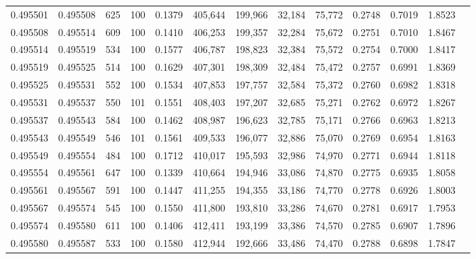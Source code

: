\begin{tabular}{rrrrrrrrrrrrr}
0.495501 & 0.495508 &   625 & 100 &                                     0.1379 & 405,644 & 199,966 &  32,184 &  75,772 & 0.2748 & 0.7019 & 1.8523 \\
0.495508 & 0.495514 &   609 & 100 &                                     0.1410 & 406,253 & 199,357 &  32,284 &  75,672 & 0.2751 & 0.7010 & 1.8467 \\
0.495514 & 0.495519 &   534 & 100 &                                     0.1577 & 406,787 & 198,823 &  32,384 &  75,572 & 0.2754 & 0.7000 & 1.8417 \\
0.495519 & 0.495525 &   514 & 100 &                                     0.1629 & 407,301 & 198,309 &  32,484 &  75,472 & 0.2757 & 0.6991 & 1.8369 \\
0.495525 & 0.495531 &   552 & 100 &                                     0.1534 & 407,853 & 197,757 &  32,584 &  75,372 & 0.2760 & 0.6982 & 1.8318 \\
0.495531 & 0.495537 &   550 & 101 &                                     0.1551 & 408,403 & 197,207 &  32,685 &  75,271 & 0.2762 & 0.6972 & 1.8267 \\
0.495537 & 0.495543 &   584 & 100 &                                     0.1462 & 408,987 & 196,623 &  32,785 &  75,171 & 0.2766 & 0.6963 & 1.8213 \\
0.495543 & 0.495549 &   546 & 101 &                                     0.1561 & 409,533 & 196,077 &  32,886 &  75,070 & 0.2769 & 0.6954 & 1.8163 \\
0.495549 & 0.495554 &   484 & 100 &                                     0.1712 & 410,017 & 195,593 &  32,986 &  74,970 & 0.2771 & 0.6944 & 1.8118 \\
0.495554 & 0.495561 &   647 & 100 &                                     0.1339 & 410,664 & 194,946 &  33,086 &  74,870 & 0.2775 & 0.6935 & 1.8058 \\
0.495561 & 0.495567 &   591 & 100 &                                     0.1447 & 411,255 & 194,355 &  33,186 &  74,770 & 0.2778 & 0.6926 & 1.8003 \\
0.495567 & 0.495574 &   545 & 100 &                                     0.1550 & 411,800 & 193,810 &  33,286 &  74,670 & 0.2781 & 0.6917 & 1.7953 \\
0.495574 & 0.495580 &   611 & 100 &                                     0.1406 & 412,411 & 193,199 &  33,386 &  74,570 & 0.2785 & 0.6907 & 1.7896 \\
0.495580 & 0.495587 &   533 & 100 &                                     0.1580 & 412,944 & 192,666 &  33,486 &  74,470 & 0.2788 & 0.6898 & 1.7847 \\

\end{tabular}

